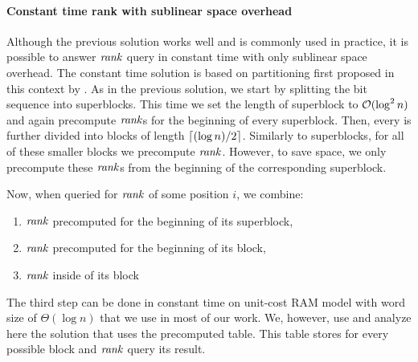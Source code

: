 \paragraph{Constant time rank with sublinear space overhead}

Although the previous solution works well and is commonly used in practice, it is possible to
answer $\mathit{rank}$ query in constant time with only sublinear space overhead. The constant time
solution is based on partitioning first proposed in this context by \cite{okanohara2007practical}.
As in the previous solution, we start by splitting the bit sequence into superblocks. This time
we set the length of superblock to $\mathcal{O}(\log^2 n)$ and again precompute $\mathit{rank}$s for the beginning of
every superblock. Then, every is further divided into blocks of length $\left\lceil (\log n)/2 \right\rceil$. Similarly to
superblocks, for all of these smaller blocks we precompute $\mathit{rank}$. However, to save space, we
only precompute these $\mathit{rank}$s from the beginning of the corresponding superblock.

Now, when queried for $\mathit{rank}$ of some position $i$, we combine:
\begin{enumerate}
    \item $\mathit{rank}$ precomputed for the beginning of its superblock,
    \item $\mathit{rank}$ precomputed for the beginning of its block,
    \item $\mathit{rank}$ inside of its block
\end{enumerate}

The third step can be done in constant time on unit-cost RAM model with word size of $\Theta(\log n)$
that we use in most of our work. We, however, use and analyze here the solution that uses the precomputed table.
This table stores for every possible block and $\mathit{rank}$ query its result. 

